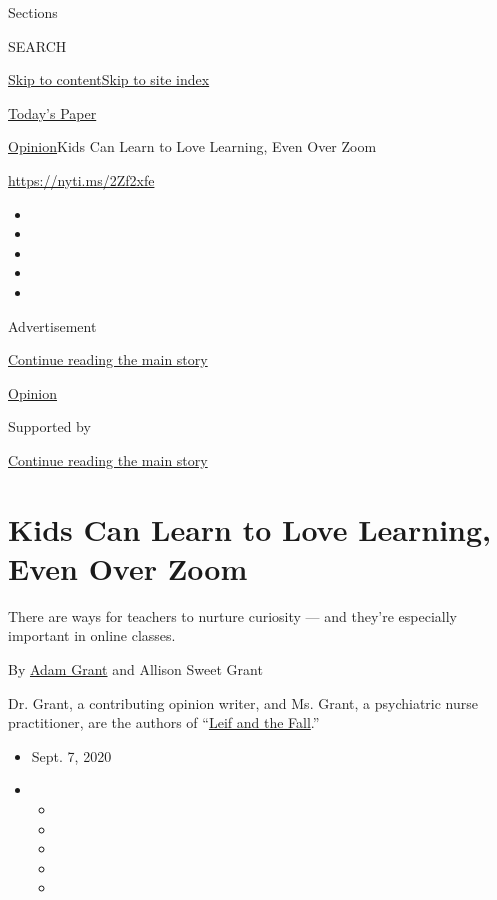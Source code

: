 Sections

SEARCH

\protect\hyperlink{site-content}{Skip to
content}\protect\hyperlink{site-index}{Skip to site index}

\href{https://myaccount.nytimes3xbfgragh.onion/auth/login?response_type=cookie\&client_id=vi}{}

\href{https://www.nytimes3xbfgragh.onion/section/todayspaper}{Today's
Paper}

\href{/section/opinion}{Opinion}\textbar{}Kids Can Learn to Love
Learning, Even Over Zoom

\url{https://nyti.ms/2Zf2xfe}

\begin{itemize}
\item
\item
\item
\item
\item
\end{itemize}

Advertisement

\protect\hyperlink{after-top}{Continue reading the main story}

\href{/section/opinion}{Opinion}

Supported by

\protect\hyperlink{after-sponsor}{Continue reading the main story}

\hypertarget{kids-can-learn-to-love-learning-even-over-zoom}{%
\section{Kids Can Learn to Love Learning, Even Over
Zoom}\label{kids-can-learn-to-love-learning-even-over-zoom}}

There are ways for teachers to nurture curiosity --- and they're
especially important in online classes.

By \href{https://www.nytimes3xbfgragh.onion/column/adam-grant}{Adam
Grant} and Allison Sweet Grant

Dr. Grant, a contributing opinion writer, and Ms. Grant, a psychiatric
nurse practitioner, are the authors of
``\href{https://www.amazon.com/Leif-Fall-Allison-Sweet-Grant/dp/1984815490}{Leif
and the Fall}.''

\begin{itemize}
\item
  Sept. 7, 2020
\item
  \begin{itemize}
  \item
  \item
  \item
  \item
  \item
  \end{itemize}
\end{itemize}

